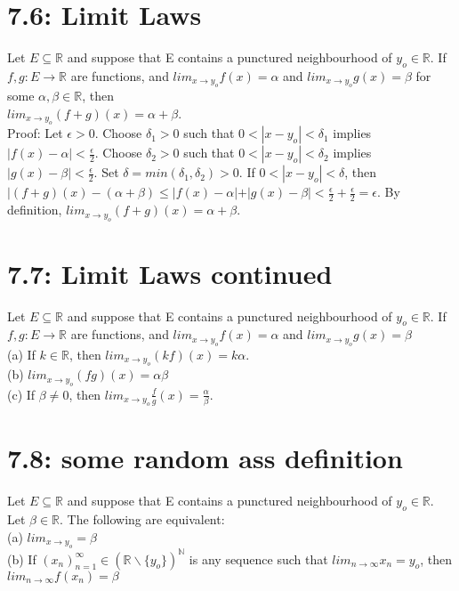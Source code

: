 \documentclass[10pt,letter]{report}
\begin{document}
\section*{7.6: Limit Laws}
Let $E \subseteq \mathbb{R}$ and suppose that E contains a punctured neighbourhood of $y_o\in\mathbb{R}$. If $f,g : E\rightarrow\mathbb{R}$ are functions, and $lim_{x\rightarrow y_o}f(x)= \alpha$ and $lim_{x\rightarrow y_o}g(x)= \beta$ for some $\alpha, \beta  \in\mathbb{R}$, then \\ 
$lim_{x\rightarrow y_o}(f+g)(x)= \alpha + \beta$. \\ 
Proof: Let $\epsilon > 0$. Choose $\delta_1 > 0$ such that $0 < |x-y_o|<\delta_1$ implies $|f(x)-\alpha|<\frac{\epsilon}{2}$. Choose $\delta_2 > 0$ such that $0 < |x-y_o|<\delta_2$ implies $|g(x)-\beta|<\frac{\epsilon}{2}$. Set $\delta = min(\delta_1,\delta_2) > 0$. If $0 < |x-y_o|<\delta$, then $|(f+g)(x)-(\alpha+\beta)\leq |f(x)-\alpha|+|g(x)-\beta| < \frac{\epsilon}{2} + \frac{\epsilon}{2} = \epsilon$. By definition, $lim_{x\rightarrow y_o}(f+g)(x) = \alpha+\beta$. 

\section*{7.7: Limit Laws continued}
Let $E \subseteq \mathbb{R}$ and suppose that E contains a punctured neighbourhood of $y_o\in\mathbb{R}$. If $f,g : E\rightarrow\mathbb{R}$ are functions, and $lim_{x\rightarrow y_o}f(x)= \alpha$ and $lim_{x\rightarrow y_o}g(x)= \beta$\\  
(a) If $k \in \mathbb{R}$, then $lim_{x\rightarrow y_o}(kf)(x) = k\alpha$.\\ 
(b) $lim_{x\rightarrow y_o}(fg)(x) = \alpha\beta$\\ 
(c) If $\beta \neq 0$, then $lim_{x\rightarrow y_o}\frac{f}{g}(x) = \frac{\alpha}{\beta}$.

\section*{7.8: some random ass definition}
Let $E \subseteq \mathbb{R}$ and suppose that E contains a punctured neighbourhood of $y_o\in\mathbb{R}$. Let $\beta\in\mathbb{R}$. The following are equivalent: \\ 
(a) $lim_{x\rightarrow y_o} = \beta$ \\ 
(b) If $(x_n)_{n=1}^\infty \in (\mathbb{R} \backslash \{y_o\})^\mathbb{N}$ is any sequence such that $lim_{n\rightarrow\infty}x_n = y_o$, then $lim_{n\rightarrow\infty}f(x_n) = \beta$
\end{document}
